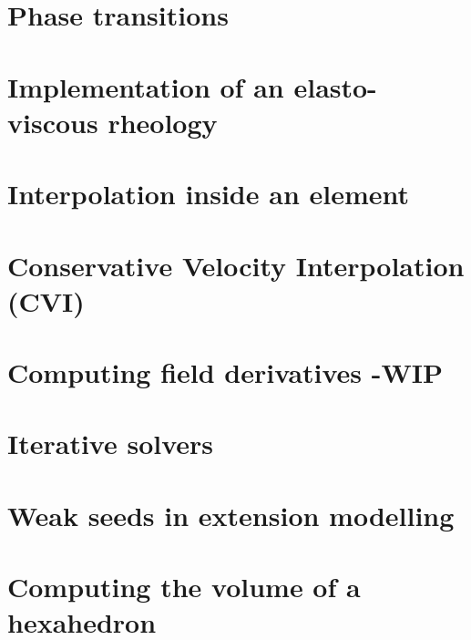 \section{Phase transitions}\label{ss:phasetransitions} %
\newpage %
\section{Implementation of an elasto-viscous rheology} \label{ss:evrheo}  %
\newpage %
\section{Interpolation inside an element} \label{ss:bern}  %
\newpage %
\section{Conservative Velocity Interpolation (CVI)} \label{sec:cvi} %
\newpage %
\section{Computing field derivatives -WIP} \label{ss:nodderiv}  %
\newpage %
\section{Iterative solvers \label{ss:itsolvers}}  %
\newpage %
\section{Weak seeds in extension modelling \label{ss:weakseeds}}  %
\newpage %
\section{Computing the volume of a hexahedron}  %
\newpage %
